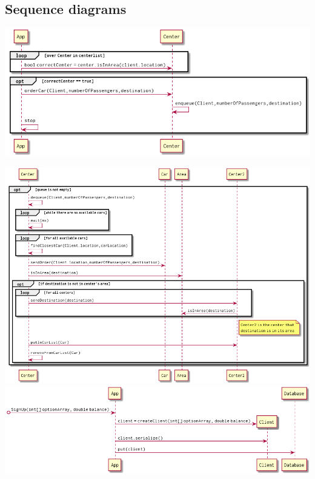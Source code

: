 \documentclass[a4paper]{article}
\begin{document}
\subsection*{Sequence diagrams}
\includegraphics[width=1\textwidth]{../Diagrams/orderCar.png}

\includegraphics[width=1\textwidth]{../Diagrams/sendCar.png}
\includegraphics[width=1\textwidth]{../Diagrams/registerClient.png}
\end{document}
